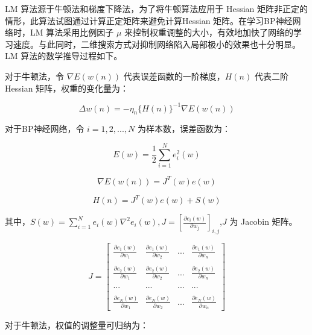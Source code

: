 \documentclass[UTF8]{ctexart}
\begin{document}
LM 算法源于牛顿法和梯度下降法，为了将牛顿算法应用于 Hessian 矩阵非正定的情形，此算法试图通过计算正定矩阵来避免计算Hessian 矩阵。在学习BP神经网络时，LM 算法采用比例因子 $\mu$ 来控制权重调整的大小，有效地加快了网络的学习速度。与此同时，二维搜索方式对抑制网络陷入局部极小的效果也十分明显。LM 算法的数学推导过程如下。 \par

对于牛顿法，令 $\nabla E(w(n))$ 代表误差函数的一阶梯度，$H(n)$ 代表二阶 Hessian 矩阵，权重的变化量为：

\begin{equation}
\Delta w(n) = - \eta_n \{ H(n) \}^{-1} \nabla E(w(n))
\end{equation}

对于BP神经网络，令 $i = 1,2,...,N$ 为样本数，误差函数为：

\begin{equation}
E(w) = \frac{1}{2} \sum_{i=1}^{N} e_{i}^{2} (w)
\end{equation}

\begin{equation}
\nabla E(w(n)) = J^T(w)e(w)
\end{equation}

\begin{equation}
H(n) = J^T(w)e(w) + S(w)
\end{equation}

其中，$S(w)=\sum_{i=1}^{N} e_i(w) \nabla^2 e_i(w), J = [\frac{\partial e_i(w)}{\partial w_j}]_{i,j}$,$J$ 为 Jacobin 矩阵。 \par

\begin{equation}
J = \begin{bmatrix}
\frac{\partial e_1(w)}{\partial w_1} & \frac{\partial e_1(w)}{\partial w_2} & ... & \frac{\partial e_1(w)}{\partial w_n} \\\\
\frac{\partial e_2(w)}{\partial w_1} & \frac{\partial e_2(w)}{\partial w_2} & ... & \frac{\partial e_2(w)}{\partial w_n} \\\\
... & ... & ... & ... \\\\
\frac{\partial e_N(w)}{\partial w_1} & \frac{\partial e_N(w)}{\partial w_2} & ... & \frac{\partial e_N(w)}{\partial w_n}
\end{bmatrix}
\end{equation}

对于牛顿法，权值的调整量可归纳为：\par
\end{document}
